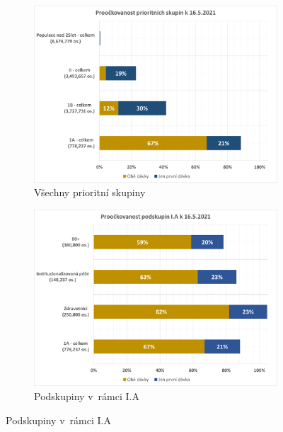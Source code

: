 \begin{figure}
\centering

\begin{subfigure}{0.9\textwidth}
\includegraphics[height=0.3\textheight, width=\textwidth]{assets/proockovanost_vsechnyPS}
\caption{Všechny prioritní skupiny}
\label{proockovanost_ps_vsechny}
\end{subfigure}

\begin{subfigure}{0.9\textwidth}
\includegraphics[height=0.3\textheight, width=\textwidth]{assets/proockovanost_1A}
\caption{Podskupiny v~rámci I.A}
\label{proockovanost_ps_1a}
\end{subfigure}


\end{figure}
